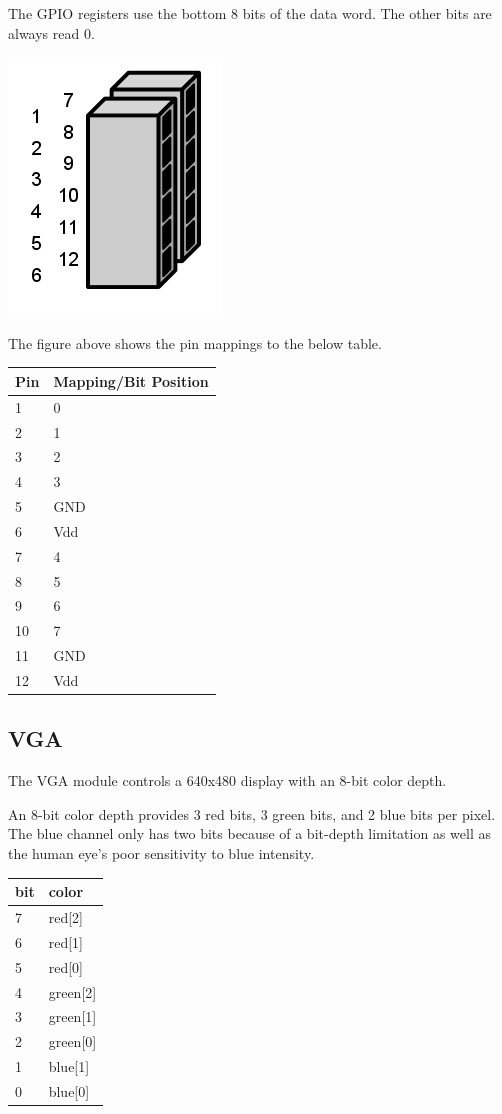 \documentclass{article}
\begin{document}
The GPIO registers use the bottom 8 bits of the data word. The other bits are always read 0. 

\begin{center}
\includegraphics[scale=0.5]{../../images/GPIO.png}
\end{center}

The figure above shows the pin mappings to the below table. 

\begin{tabular}{ | l | l |}
\hline
Pin & Mapping/Bit Position \\
\hline
1 & 0 \\
2 & 1 \\
3 & 2 \\
4 &3 \\
5 & GND \\
6 & Vdd \\
7 & 4 \\
8 & 5 \\
9 & 6 \\
10 & 7 \\
11 & GND \\
12 & Vdd \\
\hline
\end{tabular}

\subsection{VGA}
The VGA module controls a 640x480 display with an 8-bit color depth.

An 8-bit color depth provides 3 red bits, 3 green bits, and 2 blue bits per pixel. The blue channel only has two bits because of a bit-depth limitation as well as the human eye's poor sensitivity to blue intensity. 

\begin{tabular}{ | l | l |}
\hline
bit & color \\
\hline
7 & red[2] \\
6 & red[1] \\
5 & red[0] \\ 
4 & green[2] \\
3 & green[1] \\
2 & green[0] \\
1 & blue[1] \\
0 & blue[0] \\
\hline
\end{tabular}
\end{document}
